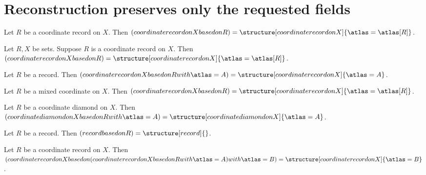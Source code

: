 

\section{Reconstruction preserves only the requested fields}

\begin{proposition}\label{reconstruction_copies_atlas}
    Let $R$ be a coordinate record on $X$.
    Then $(coordinate record on X based on R)=
        \structure[coordinate record on X]{\atlas=\atlas[R]}$.
\end{proposition}

\begin{proposition}\label{reconstruction_asserted_base}
    Let $R,X$ be sets.
    Suppose $R$ is a coordinate record on $X$.
    Then $(coordinate record on X based on R)=
        \structure[coordinate record on X]{\atlas=\atlas[R]}$.
\end{proposition}

\begin{proposition}\label{reconstruction_parent_base}
    Let $R$ be a record.
    Then $(coordinate record on X based on R with \atlas=A)=
        \structure[coordinate record on X]{\atlas=A}$.
\end{proposition}

\begin{proposition}\label{reconstruction_drops_extra_fields}
    Let $R$ be a mixed coordinate on $X$.
    Then $(coordinate record on X based on R)=
        \structure[coordinate record on X]{\atlas=\atlas[R]}$.
\end{proposition}

\begin{proposition}\label{reconstruction_diamond}
    Let $R$ be a coordinate diamond on $X$.
    Then $(coordinate diamond on X based on R with \atlas=A)=
        \structure[coordinate diamond on X]{\atlas=A}$.
\end{proposition}

\begin{proposition}\label{reconstruction_empty}
    Let $R$ be a record.
    Then $(record based on R)=\structure[record]{}$.
\end{proposition}

\begin{proposition}\label{reconstruction_nested}
    Let $R$ be a coordinate record on $X$.
    Then $(coordinate record on X based on
        (coordinate record on X based on R with \atlas=A) with \atlas=B)=
        \structure[coordinate record on X]{\atlas=B}$.
\end{proposition}

